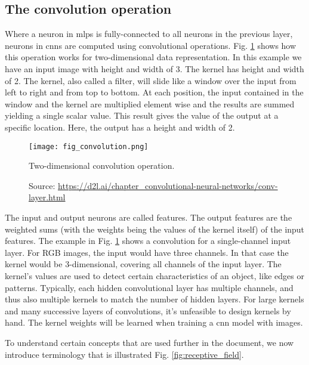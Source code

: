\subsection{The convolution operation}
Where a neuron in \acrshort{mlp}s is fully-connected to all neurons in the previous layer, neurons in \acrshort{cnn}s are computed using convolutional operations. Fig. \ref{fig:convolution} shows how this operation works for two-dimensional data representation. In this example we have an input image with height and width of 3. The kernel has height and width of 2. The kernel, also called a filter, will slide like a window over the input from left to right and from top to bottom. At each position, the input contained in the window and the kernel are multiplied element wise and the results are summed yielding a single scalar value. This result gives the value of the output at a specific location. Here, the output has a height and width of 2.
\begin{figure}[ht]
    \begin{center}       
    \texttt{[image: fig\_convolution.png]}
    \caption[Two-dimensional convolution operation]{Two-dimensional convolution operation.}
    \caption*{Source: \href{https://d2l.ai/chapter\_convolutional-neural-networks/conv-layer.html}{https://d2l.ai/chapter\_convolutional-neural-networks/conv-layer.html}}
    \label{fig:convolution}
    \end{center}
\end{figure}

The input and output neurons are called features. The output features are the weighted sums (with the weights being the values of the kernel itself) of the input features. The example in Fig. \ref{fig:convolution} shows a convolution for a single-channel input layer. For RGB images, the input would have three channels. In that case the kernel would be 3-dimensional, covering all channels of the input layer. The kernel's values are used to detect certain characteristics of an object, like edges or patterns. Typically, each hidden convolutional layer has multiple channels, and thus also multiple kernels to match the number of hidden layers. For large kernels and many successive layers of convolutions, it's unfeasible to design kernels by hand. The kernel weights will be learned when training a \acrshort{cnn} model with images.

To understand certain concepts that are used further in the document, we now introduce terminology that is illustrated Fig. \ref{fig:receptive_field}.

